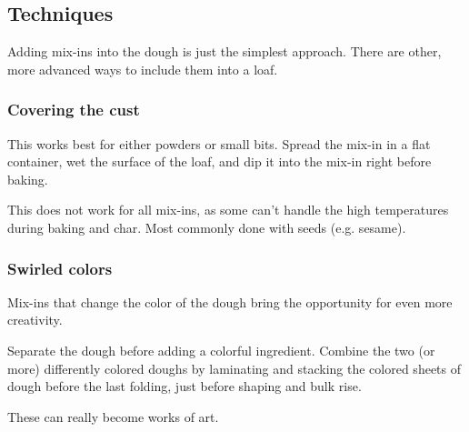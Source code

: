 \subsection{Techniques}
Adding mix-ins into the dough is just the simplest approach. There are other, more advanced ways to include them into a loaf.

\subsubsection{Covering the cust}
This works best for either powders or small bits. Spread the mix-in in a flat container, wet the surface of the loaf, and dip it into the mix-in right before baking.

This does not work for all mix-ins, as some can't handle the high temperatures during baking and char. Most commonly done with seeds (e.g. sesame).

\subsubsection{Swirled colors}
Mix-ins that change the color of the dough bring the opportunity for even more creativity.

Separate the dough before adding a colorful ingredient. Combine the two (or more) differently colored doughs by laminating and stacking the colored sheets of dough before the last folding, just before shaping and bulk rise.

These can really become works of art.

